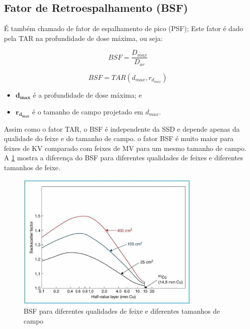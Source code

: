 \documentclass[11pt,a4paper]{article}
\newcounter{exemplo}
\begin{document}
	\subsection{Fator de Retroespalhamento (BSF)}

	É também chamado de fator de espalhamento de pico (PSF); Este fator é dado pela TAR na profundidade de dose máxima, ou seja:

		\begin{equation}
			BSF = \frac{D_{max}}{D_{ar}}
		\end{equation}

		\begin{equation}
			BSF = TAR(d_{max}, r_{d_{max}})
		\end{equation}

	\begin{exemplo}[onde:]
		\begin{itemize}
			\item \textcolor{CarnationPink}{$\mathbf{d_{max}}$} é a profundidade de dose máxima; e
			\item \textcolor{CarnationPink}{$\mathbf{r_{d_{max}}}$} é o tamanho de campo projetado em $d_{max}$.
		\end{itemize}
	\end{exemplo}
	
	Assim como o fator TAR, o BSF é independente da SSD e depende apenas da qualidade do feixe e do tamanho de campo.  o fator BSF é muito maior para feixes de KV comparado com feixes de MV para um mesmo tamanho de campo. A \ref{fig:bsf} mostra a diferença do BSF para diferentes qualidades de feixes e diferentes tamanhos de feixe. 

	\begin{figure}[h]
		\centering
		\includegraphics[width=0.8\textwidth]{Imagens/bsf.JPG}
		\caption{BSF para diferentes qualidades de feixe e diferentes tamanhos de campo}
		\label{fig:bsf}                
	\end{figure}
\end{document}
